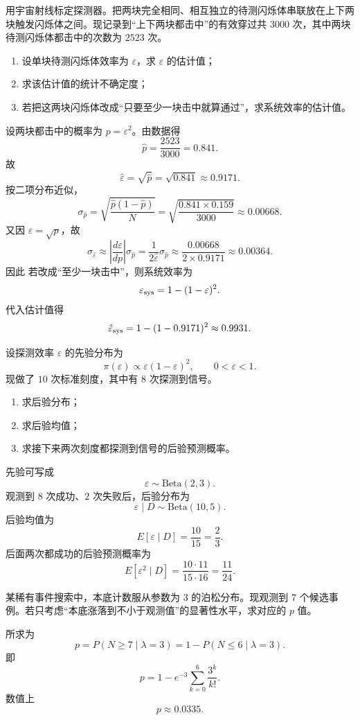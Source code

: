 \begin{question}
用宇宙射线标定探测器。把两块完全相同、相互独立的待测闪烁体串联放在上下两块触发闪烁体之间。现记录到“上下两块都击中”的有效穿过共 $3000$ 次，其中两块待测闪烁体都击中的次数为 $2523$ 次。
\begin{enumerate}
\item 设单块待测闪烁体效率为 $\varepsilon$，求 $\varepsilon$ 的估计值；
\item 求该估计值的统计不确定度；
\item 若把这两块闪烁体改成“只要至少一块击中就算通过”，求系统效率的估计值。
\end{enumerate}
\begin{solution}
设两块都击中的概率为 $p=\varepsilon^2$。由数据得
\[
\hat p=\frac{2523}{3000}=0.841.
\]
故
\[
\hat\varepsilon=\sqrt{\hat p}=\sqrt{0.841}\approx 0.9171.
\]
按二项分布近似，
\[
\sigma_{\hat p}=\sqrt{\frac{\hat p(1-\hat p)}{N}}
=\sqrt{\frac{0.841\times 0.159}{3000}}
\approx 0.00668.
\]
又因 $\varepsilon=\sqrt p$，故
\[
\sigma_{\hat\varepsilon}\approx \left|\frac{d\varepsilon}{dp}\right|\sigma_{\hat p}
=\frac{1}{2\hat\varepsilon}\sigma_{\hat p}
\approx \frac{0.00668}{2\times 0.9171}
\approx 0.00364.
\]
因此
若改成“至少一块击中”，则系统效率为
\[
\varepsilon_{\rm sys}=1-(1-\varepsilon)^2.
\]
代入估计值得
\[
\hat\varepsilon_{\rm sys}=1-(1-0.9171)^2\approx 0.9931.
\]
\end{solution}
\end{question}

\begin{question}
设探测效率 $\varepsilon$ 的先验分布为
\[
\pi(\varepsilon)\propto \varepsilon(1-\varepsilon)^2,
\qquad 0<\varepsilon<1.
\]
现做了 $10$ 次标准刻度，其中有 $8$ 次探测到信号。
\begin{enumerate}
\item 求后验分布；
\item 求后验均值；
\item 求接下来两次刻度都探测到信号的后验预测概率。
\end{enumerate}
\begin{solution}
先验可写成
\[
\varepsilon\sim \mathrm{Beta}(2,3).
\]
观测到 $8$ 次成功、$2$ 次失败后，后验分布为
\[
\varepsilon\mid D\sim \mathrm{Beta}(10,5).
\]
后验均值为
\[
E[\varepsilon\mid D]=\frac{10}{15}=\frac23.
\]
后面两次都成功的后验预测概率为
\[
E[\varepsilon^2\mid D]
=\frac{10\cdot 11}{15\cdot 16}
=\frac{11}{24}.
\]
\end{solution}
\end{question}

\begin{question}
某稀有事件搜索中，本底计数服从参数为 $3$ 的泊松分布。现观测到 $7$ 个候选事例。若只考虑“本底涨落到不小于观测值”的显著性水平，求对应的 $p$ 值。
\begin{solution}
所求为
\[
p=P(N\ge 7\mid \lambda=3)=1-P(N\le 6\mid \lambda=3).
\]
即
\[
p=1-e^{-3}\sum_{k=0}^{6}\frac{3^k}{k!}.
\]
数值上
\[
p\approx 0.0335.
\]
\end{solution}
\end{question}

